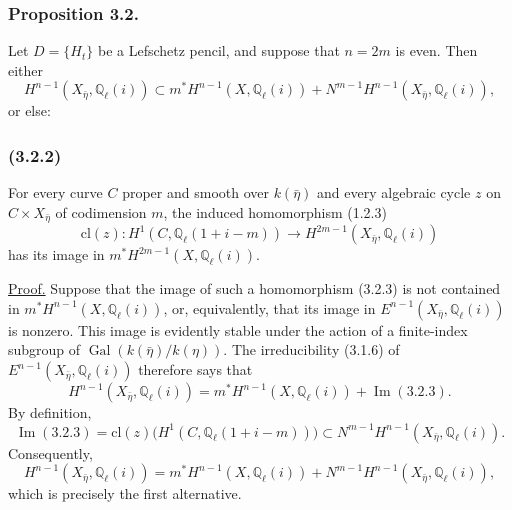 \subsubsection*{Proposition 3.2.}
Let $D=\{H_t\}$ be a Lefschetz pencil, and suppose that $n=2m$ is even.
Then either
\begin{equation}\tag{3.2.1}
H^{n-1}(X_{\bar\eta},\mathbb Q_\ell(i))
\subset m^*H^{n-1}(X,\mathbb Q_\ell(i))
+N^{m-1}H^{n-1}(X_{\bar\eta},\mathbb Q_\ell(i)),
\end{equation}
or else:

\subsubsection*{(3.2.2)}
For every curve $C$ proper and smooth over $k(\bar\eta)$ and every
algebraic cycle $z$ on $C\times X_{\bar\eta}$ of codimension $m$, the
induced homomorphism (1.2.3)
\begin{equation}\tag{3.2.3}
\mathrm{cl}(z):H^1(C,\mathbb Q_\ell(1+i-m))
\longrightarrow H^{2m-1}(X_{\bar\eta},\mathbb Q_\ell(i))
\end{equation}
has its image in $m^*H^{2m-1}(X,\mathbb Q_\ell(i))$.

\noindent\underline{Proof.}
Suppose that the image of such a homomorphism (3.2.3) is not contained in
$m^*H^{n-1}(X,\mathbb Q_\ell(i))$, or, equivalently, that its image in
$E^{n-1}(X_{\bar\eta},\mathbb Q_\ell(i))$ is nonzero.  This image is
evidently stable under the action of a finite-index subgroup of
$\operatorname{Gal}(k(\bar\eta)/k(\eta))$.  The irreducibility (3.1.6) of
$E^{n-1}(X_{\bar\eta},\mathbb Q_\ell(i))$ therefore says that
\begin{equation*}
H^{n-1}(X_{\bar\eta},\mathbb Q_\ell(i))
=m^*H^{n-1}(X,\mathbb Q_\ell(i))+\operatorname{Im}(3.2.3).
\end{equation*}
By definition,
\begin{equation*}
\operatorname{Im}(3.2.3)
=\mathrm{cl}(z)\bigl(H^1(C,\mathbb Q_\ell(1+i-m))\bigr)
\subset N^{m-1}H^{n-1}(X_{\bar\eta},\mathbb Q_\ell(i)).
\end{equation*}
Consequently,
\begin{equation*}
H^{n-1}(X_{\bar\eta},\mathbb Q_\ell(i))
=m^*H^{n-1}(X,\mathbb Q_\ell(i))
+N^{m-1}H^{n-1}(X_{\bar\eta},\mathbb Q_\ell(i)),
\end{equation*}
which is precisely the first alternative.
